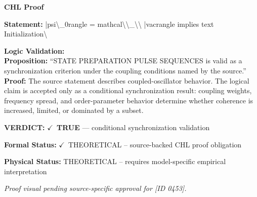 \vspace{0.45em}
\noindent\textbf{CHL Proof}\par
\textbf{Statement:} |psi\textbackslash{}\_0rangle = mathcal\textbackslash{}\textbackslash{}\_\textbackslash{}\textbackslash{} |vacrangle implies text Initialization\textbackslash{}

\textbf{Logic Validation:}\\
\textbf{Proposition:} ``STATE PREPARATION PULSE SEQUENCES is valid as a synchronization criterion under the
coupling conditions named by the source.''\\
\textbf{Proof:} The source statement describes coupled-oscillator behavior. The logical claim is
accepted only as a conditional synchronization result: coupling weights, frequency
spread, and order-parameter behavior determine whether coherence is increased, limited,
or dominated by a subset.

\textbf{VERDICT:} \ensuremath{\checkmark}\ \textbf{TRUE} --- conditional synchronization validation

\textbf{Formal Status:} \ensuremath{\checkmark}\ THEORETICAL -- source-backed CHL proof obligation

\textbf{Physical Status:} THEORETICAL -- requires model-specific empirical interpretation
\par\vspace{0.45em}
\par
\vfill
\begingroup\footnotesize\itshape
Proof visual pending source-specific approval for [ID 0453].
\par\endgroup
\vfill
\endgroup
\endgroup
